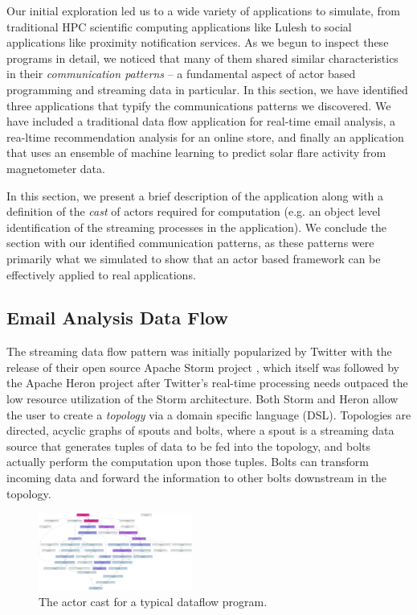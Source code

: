 \documentclass[draftclsnofoot,onecolumn,conference,11pt]{IEEEtran}
\begin{document}
Our initial exploration led us to a wide variety of applications to simulate, from traditional HPC scientific computing applications like Lulesh to social applications like proximity notification services. As we begun to inspect these programs in detail, we noticed that many of them shared similar characteristics in their \textit{communication patterns} -- a fundamental aspect of actor based programming and streaming data in particular. In this section, we have identified three applications that typify the communications patterns we discovered. We have included a traditional data flow application for real-time email analysis, a rea-ltime recommendation analysis for an online store, and finally an application that uses an ensemble of machine learning to predict solar flare activity from magnetometer data.

In this section, we present a brief description of the application along with a definition of the \textit{cast} of actors required for computation (e.g. an object level identification of the streaming processes in the application). We conclude the section with our identified communication patterns, as these patterns were primarily what we simulated to show that an actor based framework can be effectively applied to real applications.

\subsection{Email Analysis Data Flow}

The streaming data flow pattern was initially popularized by Twitter with the release of their open source Apache Storm project \cite{toshniwal_storm_2014}, which itself was followed by the Apache Heron project \cite{kulkarni_twitter_2015} after Twitter's real-time processing needs outpaced the low resource utilization of the Storm architecture. Both Storm and Heron allow the user to create a \textit{topology} via a domain specific language (DSL). Topologies are directed, acyclic graphs of spouts and bolts, where a spout is a streaming data source that generates tuples of data to be fed into the topology, and bolts actually perform the computation upon those tuples. Bolts can transform incoming data and forward the information to other bolts downstream in the topology.

\begin{figure}[!h]
    \centering
    \includegraphics[width=0.45\textwidth]{dataflow_cast}
    \caption{The actor cast for a typical dataflow program.}
    \label{fig:dataflow_cast}
\end{figure}
\end{document}
